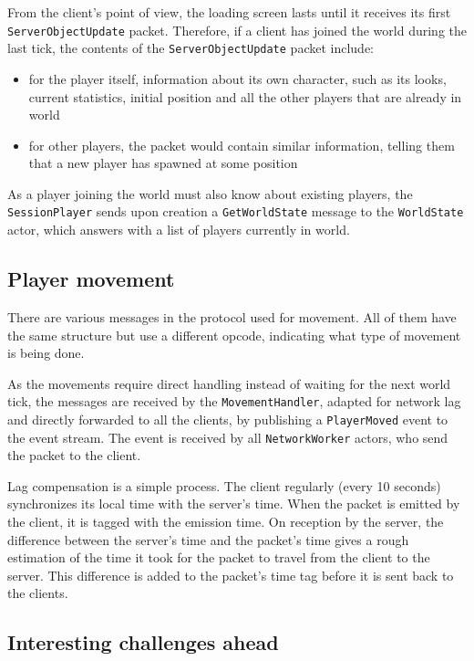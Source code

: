 \documentclass[paper=a4, fontsize=11pt]{scrartcl}
\begin{document}
From the client's point of view, the loading screen lasts until it receives its
first \texttt{ServerObjectUpdate} packet.
Therefore, if a client has joined the world during the last tick, the contents
of the \texttt{ServerObjectUpdate} packet include:
\begin{itemize}
    \item for the player itself, information about its
        own character, such as its looks, current statistics, initial
        position and all the other players that are already in world
    \item for other players, the packet would contain similar information,
        telling them that a new player has spawned at some position
\end{itemize}

As a player joining the world must also know about existing players, the
\texttt{SessionPlayer} sends upon creation a \texttt{GetWorldState} message to
the \texttt{WorldState} actor, which answers with a list of players currently in
world.

\subsection{Player movement}

There are various messages in the protocol used for movement.
All of them have the same structure but use a different opcode, indicating what
type of movement is being done.

As the movements require direct handling instead of waiting for the next world
tick, the messages are received by the \texttt{MovementHandler}, adapted for
network lag and directly forwarded to all the clients, by publishing a
\texttt{PlayerMoved} event to the event stream.
The event is received by all \texttt{NetworkWorker} actors, who send the packet
to the client.

Lag compensation is a simple process.
The client regularly (every 10 seconds) synchronizes its local time with the
server's time.
When the packet is emitted by the client, it is tagged with the emission time.
On reception by the server, the difference between the server's time and the
packet's time gives a rough estimation of the time it took for the packet to
travel from the client to the server. 
This difference is added to the packet's time tag before it is sent back to
the clients.

\subsection{Interesting challenges ahead}
\end{document}
